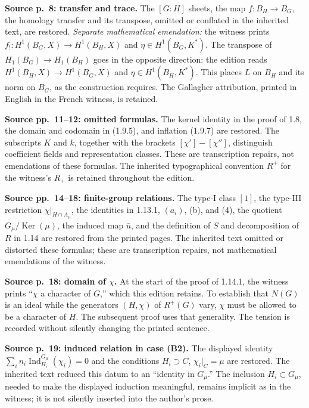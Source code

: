 \documentclass[10pt,letterpaper]{article}
\newcommand{\Ind}{\operatorname{Ind}}
\providecommand{\Ker}{\operatorname{Ker}}
\providecommand{\Ind}{\operatorname{Ind}}
\providecommand{\Ker}{\operatorname{Ker}}
\begin{document}
\begin{description}[style=nextline,leftmargin=2.6em,labelwidth=2.2em,font=\normalfont\bfseries]
\item[E25] \textbf{Source p.~8: transfer and trace.} The \([G:H]\) sheets, the map \(f:B_H\to B_G\), the homology transfer and its transpose, omitted or conflated in the inherited text, are restored. \textit{Separate mathematical emendation:} the witness prints \(f_!:H^1(B_G,X)\to H^1(B_H,X)\) and \(\eta\in H^1(B_G,K^*)\). The transpose of \(H_1(B_G)\to H_1(B_H)\) goes in the opposite direction: the edition reads \(H^1(B_H,X)\to H^1(B_G,X)\) and \(\eta\in H^1(B_H,K^*)\). This places \(L\) on \(B_H\) and its norm on \(B_G\), as the construction requires. The Gallagher attribution, printed in English in the French witness, is retained.
\item[E26] \textbf{Source pp.~11--12: omitted formulas.} The kernel identity in the proof of 1.8, the domain and codomain in (1.9.5), and inflation (1.9.7) are restored. The subscripts \(K\) and \(k\), together with the brackets \([\chi']-[\chi'']\), distinguish coefficient fields and representation classes. These are transcription repairs, not emendations of these formulas. The inherited typographical convention \(R^+\) for the witness's \(R_+\) is retained throughout the edition.
\item[E27] \textbf{Source pp.~14--18: finite-group relations.} The type-I class \([1]\), the type-III restriction \(\chi|_{H\cap A_\mu}\), the identities in 1.13.1, \((a_i)\), (b), and (4), the quotient \(G_\mu/\Ker(\mu)\), the induced map \(\bar u\), and the definition of \(S\) and decomposition of \(R\) in 1.14 are restored from the printed pages. The inherited text omitted or distorted these formulas; these are transcription repairs, not mathematical emendations of the witness.
\item[E28] \textbf{Source p.~18: domain of \(\chi\).} At the start of the proof of 1.14.1, the witness prints “\(\chi\) a character of \(G\),” which this edition retains. To establish that \(N(G)\) is an ideal while the generators \((H,\chi)\) of \(R^+(G)\) vary, \(\chi\) must be allowed to be a character of \(H\). The subsequent proof uses that generality. The tension is recorded without silently changing the printed sentence.
\item[E29] \textbf{Source p.~19: induced relation in case (B2).} The displayed identity \(\sum_i n_i\Ind_{H_i}^{G_\mu}(\chi_i)=0\) and the conditions \(H_i\supset C\), \(\chi_i|_C=\mu\) are restored. The inherited text reduced this datum to an “identity in \(G_\mu\).” The inclusion \(H_i\subset G_\mu\), needed to make the displayed induction meaningful, remains implicit as in the witness; it is not silently inserted into the author's prose.

\end{description}
\end{document}
